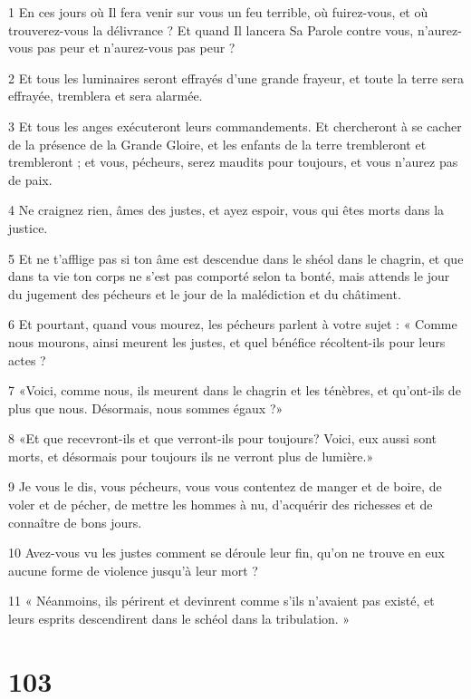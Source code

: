 \par 1 En ces jours où Il fera venir sur vous un feu terrible, où fuirez-vous, et où trouverez-vous la délivrance ? Et quand Il lancera Sa Parole contre vous, n'aurez-vous pas peur et n'aurez-vous pas peur ?
\par 2 Et tous les luminaires seront effrayés d'une grande frayeur, et toute la terre sera effrayée, tremblera et sera alarmée.
\par 3 Et tous les anges exécuteront leurs commandements. Et chercheront à se cacher de la présence de la Grande Gloire, et les enfants de la terre trembleront et trembleront ; et vous, pécheurs, serez maudits pour toujours, et vous n'aurez pas de paix.
\par 4 Ne craignez rien, âmes des justes, et ayez espoir, vous qui êtes morts dans la justice.
\par 5 Et ne t'afflige pas si ton âme est descendue dans le shéol dans le chagrin, et que dans ta vie ton corps ne s'est pas comporté selon ta bonté, mais attends le jour du jugement des pécheurs et le jour de la malédiction et du châtiment.
\par 6 Et pourtant, quand vous mourez, les pécheurs parlent à votre sujet : « Comme nous mourons, ainsi meurent les justes, et quel bénéfice récoltent-ils pour leurs actes ?
\par 7 «Voici, comme nous, ils meurent dans le chagrin et les ténèbres, et qu'ont-ils de plus que nous. Désormais, nous sommes égaux ?»
\par 8 «Et que recevront-ils et que verront-ils pour toujours? Voici, eux aussi sont morts, et désormais pour toujours ils ne verront plus de lumière.»
\par 9 Je vous le dis, vous pécheurs, vous vous contentez de manger et de boire, de voler et de pécher, de mettre les hommes à nu, d'acquérir des richesses et de connaître de bons jours.
\par 10 Avez-vous vu les justes comment se déroule leur fin, qu'on ne trouve en eux aucune forme de violence jusqu'à leur mort ?
\par 11 « Néanmoins, ils périrent et devinrent comme s'ils n'avaient pas existé, et leurs esprits descendirent dans le schéol dans la tribulation. »

\chapter{103}

